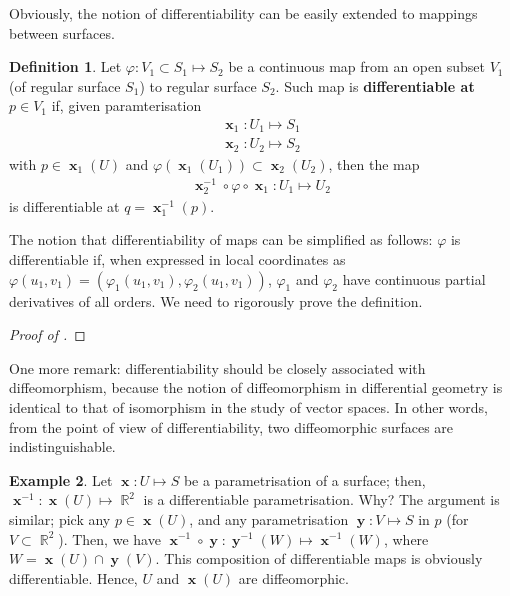 \documentclass{amsart} %
\theoremstyle{mytheoremstyle}
\theoremstyle{definition}
\newtheorem{definition}{Definition}[section]
\newtheorem{example}[definition]{Example}
\numberwithin{equation}{section}
\DeclareMathOperator{\R}{\mathbb{R}}
\DeclareMathOperator{\1}{\mathbbm{1}}
\DeclareMathOperator{\x}{\mathbf{x}}
\DeclareMathOperator{\y}{\mathbf{y}}
\renewcommand{\phi}{\varphi}
\renewcommand{\phi}{\varphi}
\begin{document}
Obviously, the notion of differentiability can be easily extended to mappings between surfaces.

\begin{definition}
	\label{defdifferentiablemaps}
	Let $\phi: V_1 \subset S_1 \mapsto S_2$ be a continuous map from an open subset $V_1$ (of regular surface $S_1$) to regular surface $S_2$. Such map is \textbf{differentiable at $p \in V_1$} if, given paramterisation
	\begin{align*}
		\x_1 : U_1 \mapsto S_1  \\
		\x_2 : U_2 \mapsto S_2
	\end{align*}
	with $p \in \x_1(U)$ and $\phi(\x_1(U_1)) \subset \x_2(U_2)$, then the map
	\begin{align*}
	\x_2^{-1} \circ \phi \circ \x_1 : U_1 \mapsto U_2
	\end{align*}
	is differentiable at $q = \x^{-1}_1 (p)$.
\end{definition}

The notion that differentiability of maps can be simplified as follows: $\phi$ is differentiable if, when expressed in local coordinates as $\phi(u_1,v_1) = (\phi_1(u_1,v_1),\phi_2(u_1,v_1))$, $\phi_1 $ and $\phi_2$ have continuous partial derivatives of all orders. We need to rigorously prove the definition.

\begin{proof}[Proof of ]
	
\end{proof}

One more remark: differentiability should be closely associated with diffeomorphism, because the notion of diffeomorphism in differential geometry is identical to that of isomorphism in the study of vector spaces. In other words, from the point of view of differentiability, two diffeomorphic surfaces are indistinguishable. 

\begin{example}
	\label{exampleinverseofmapsbetweensurfacesisdifferentiable}
	Let $\x: U \mapsto S$ be a parametrisation of a surface; then, $\x^{-1} : \x(U) \mapsto \R^2$ is a differentiable parametrisation. Why? The argument is similar; pick any $p \in \x(U)$, and any parametrisation $\y: V \mapsto S$ in $p$ (for $V \subset \R^2$). Then, we have $\x^{-1} \circ \y: \y^{-1}(W) \mapsto \x^{-1} (W)$, where $W = \x(U) \cap \y(V)$. This composition of differentiable maps is obviously differentiable. Hence, $U$ and $\x(U)$ are diffeomorphic. 
\end{example}
\end{document}
